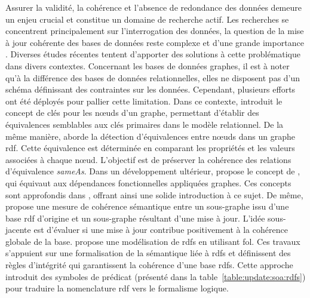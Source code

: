 Assurer la validité, la cohérence et l'absence de redondance des données demeure un enjeu crucial et constitue un domaine de recherche actif. 
Les recherches se concentrent principalement sur l'interrogation des données, la question de la mise à jour cohérente des bases de données reste complexe et d'une grande importance \cite{halfeldferrariUpdateRulesDatalog1998,scheweLimitationsRuleTriggering1998}.
Diverses études récentes tentent d'apporter des solutions à cette problématique dans divers contextes.
Concernant les bases de données graphes, il est à noter qu'à la différence des bases de données relationnelles, elles ne disposent pas d'un schéma définissant des contraintes sur les données.
Cependant, plusieurs efforts ont été déployés pour pallier cette limitation.
Dans ce contexte, \cite{fanKeysGraphs2015} introduit le concept de clés pour les nœuds d'un graphe, permettant d'établir des équivalences semblables aux clés primaires dans le modèle relationnel.
De la même manière, \cite{raadDetectionLiensIdentite2018} aborde la détection d'équivalences entre nœuds dans un graphe \gls{rdf}.
Cette équivalence est déterminée en comparant les propriétés et les valeurs associées à chaque nœud.
L'objectif est de préserver la cohérence des relations d'équivalence \textit{sameAs}.
Dans un développement ultérieur, \cite{fanDependenciesGraphs2019} propose le concept de , qui équivaut aux dépendances fonctionnelles appliquées graphes.
Ces concepts sont approfondis dans \cite{anglesPgkeysKeysProperty2021,bonifatiQueryingGraphs2018}, offrant ainsi une solide introduction à ce sujet.
De même, \cite{maillotConsistencyEvaluationRDF2014} propose une mesure de cohérence sémantique entre un sous-graphe issu d'une base \gls{rdf} d'origine et un sous-graphe résultant d'une mise à jour.
L'idée sous-jacente est d'évaluer si une mise à jour contribue positivement à la cohérence globale de la base.
\cite{flourisFormalFoundationsRDF2013} propose une modélisation de \gls{rdfs} en utilisant \gls{fol}.
Ces travaux s'appuient sur une formalisation de la sémantique liée à \gls{rdfs} et définissent des règles d'intégrité qui garantissent la cohérence d'une base \gls{rdfs}.
Cette approche introduit des symboles de prédicat (présenté dans la table~\ref{table:update:soa:rdfs}) pour traduire la nomenclature \gls{rdf} vers le formalisme logique.

